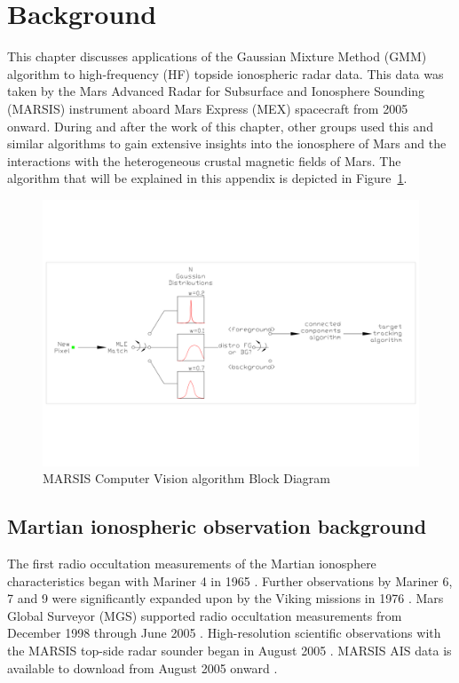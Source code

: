 \section{Background}
This chapter discusses applications of the Gaussian Mixture Method (GMM) algorithm \citep{stauffer1999,kaew2001} to high-frequency (HF) topside ionospheric radar data.
This data was taken by the Mars Advanced Radar for Subsurface and Ionosphere Sounding (MARSIS) instrument aboard Mars Express (MEX) spacecraft from 2005 onward. 
During and after the work of this chapter, other groups used this and similar algorithms to gain extensive insights into the ionosphere of Mars and the interactions with the heterogeneous crustal magnetic fields of Mars.
The algorithm that will be explained in this appendix is depicted in Figure~\ref{fig:marsisbasic}.
\begin{figure}\centering
	\includegraphics[trim=100 600 100 600,clip,width=\linewidth]{gfx/overall-block}
	\caption{MARSIS Computer Vision algorithm Block Diagram}\label{fig:marsisbasic}
\end{figure}

\subsection{Martian ionospheric observation background}
The first radio occultation measurements of the Martian ionosphere characteristics began with Mariner 4 in 1965 \citep{fjeldbo1966}.
Further observations by Mariner 6, 7 and 9 \citep{zhang1990,kliore1972} were significantly expanded upon by the Viking missions in 1976 \citep{lindal1979}. 
Mars Global Surveyor (MGS) supported radio occultation measurements from December 1998 through June 2005 \citep{hinson2006}. 
High-resolution scientific observations with the MARSIS top-side radar sounder began in August 2005 \citep{jordan2009}. 
MARSIS AIS data is available to download from August 2005 onward \citep{marsispds}.

